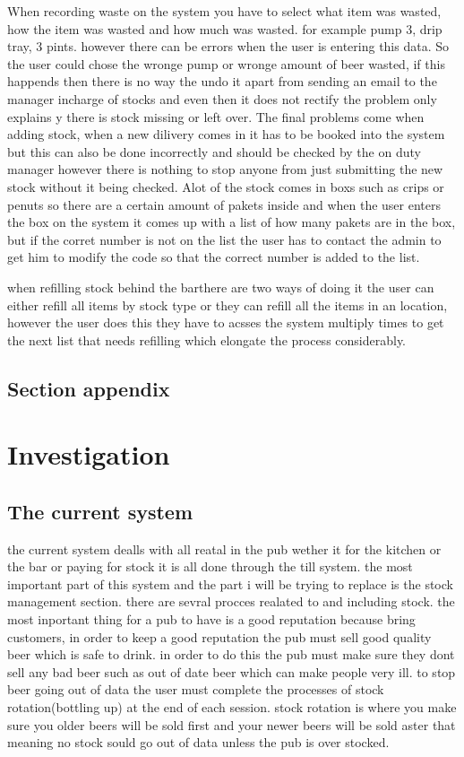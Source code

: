 When recording waste on the system you have to select what item was wasted, how the item was wasted and how much was wasted. for example pump 3, drip tray, 3 pints. however there can be errors when the user is entering this data. So the user could chose the wronge pump or wronge amount of beer wasted, if this happends then there is no way the undo it apart from sending an email to the manager incharge of stocks and even then it does not rectify the problem only explains y there is stock missing or left over. The final problems come when adding stock, when a new dilivery comes in it has to be booked into the system but this can also be done incorrectly and should be checked by the on duty manager however there is nothing to stop anyone from just submitting the new stock without it being checked. Alot of the stock comes in boxs such as crips or penuts so there are a certain amount of pakets inside and when the user enters the box on the system it comes up with a list of how many pakets are in the box, but if the corret number is not on the list the user has to contact the admin to get him to modify the code so that the correct number is added to the list.

when refilling stock behind the barthere are two ways of doing it the user can either refill all items by stock type or they can refill all the items in an location, however the user does this they have to acsses the system multiply times to get the next list that needs refilling which elongate the process considerably.

\subsection{Section appendix}

\section{Investigation}

\subsection{The current system}

the current system dealls with all reatal in the pub wether it for the kitchen or the bar or paying for stock it is all done through the till system. the most important part of this system and the part i will be trying to replace is the stock management section. there are sevral procces realated to and including stock. the most inportant thing for a pub to have is a good reputation because bring customers, in order to keep a good reputation the pub must sell good quality beer which is safe to drink. in order to do this the pub must make sure they dont sell any bad beer such as out of date beer which can make people very ill. to stop beer going out of data the user must complete the processes of stock rotation(bottling up) at the end of each session. stock rotation is where you make sure you older beers will be sold first and your newer beers will be sold aster that meaning no stock sould go out of data unless the pub is over stocked.

